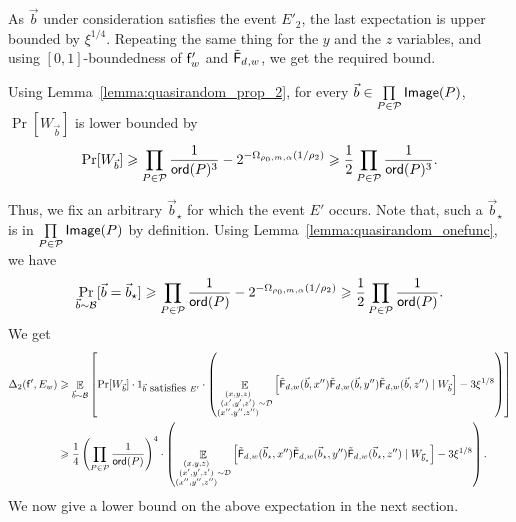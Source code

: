 \documentclass[10pt,a4paper]{amsart}
\newcommand\Expect[2]{{\mathop{\mathbb{E}}_{#1}\left[ {#2} \right]}}
\renewcommand\geq{\geqslant}
\newcommand{\V}[1]{{#1}}
\begin{document}
As $\vec{b}$ under consideration satisfies the event $E'_2$, the last expectation is upper bounded by $\xi^{1/4}$. Repeating the same thing for the $\V y$ and the $\V z$ variables, and using $[0,1]$-boundedness of $\noisyfrefined_{\V w}$ and $\truncfcoarsedecoupled_{,\V w}$, we get the required bound.

Using Lemma~\ref{lemma:quasirandom_prop_2}, for every $\vec{b}\in\prod\limits_{P\in\mathcal{P}}{\sf Image}(P)$, $\Pr[W_{\vec{b}}]$ is lower bounded by
$$\Pr[W_{\vec{b}}] \geq \prod\limits_{P\in\mathcal{P}}\frac{1}{{\sf ord}(P)^3}-2^{-\Omega_{\rho_0, m, \alpha}(1/\rho_2)}\geq \frac{1}{2}\prod\limits_{P\in\mathcal{P}}\frac{1}{{\sf ord}(P)^3}.$$

Thus, we fix an arbitrary $\vec{b}_\star$ for which the event $E'$ occurs. Note that, such a $\vec{b}_\star$ is in $\prod\limits_{P\in\mathcal{P}}{\sf Image}(P)$ by definition. Using Lemma~\ref{lemma:quasirandom_onefunc}, we have
$$\Pr_{\vec{b}\sim \mathcal{B}}[\vec{b} = \vec{b}_\star] \geq \prod\limits_{P\in\mathcal{P}}\frac{1}{{\sf ord}(P)}-2^{-\Omega_{\rho_0, m, \alpha}(1/\rho_2)}\geq \frac{1}{2}\prod\limits_{P\in\mathcal{P}}\frac{1}{{\sf ord}(P)}.$$
We get
\begingroup
\allowdisplaybreaks
\begin{align*}
\Delta_2(\noisyfrefined, E_{\V w}) &\geq\Expect{\vec{b}\sim \mathcal{B}}{\Pr[W_{\vec{b}}] \cdot 1_{\vec{b} ~\mbox{satisfies}~E'}\cdot\left( \Expect{\substack{(\V x, \V y, \V z)\\(\V x', \V y', \V z')\\ (\V x'', \V y'', \V z'')}\sim \mathcal{D}}{\truncfcoarsedecoupled_{,\V w}(\vec{b}, \V x'') \truncfcoarsedecoupled_{,\V w}(\vec{b}, \V y'') \truncfcoarsedecoupled_{,\V w}(\vec{b}, \V z'')  \mid W_{\vec{b}}} - 3\xi^{1/8}\right) }\\
& \geq \frac{1}{4}\left(\prod\limits_{P\in\mathcal{P}}\frac{1}{{\sf ord}(P)}\right)^4 \cdot \left(\Expect{\substack{(\V x, \V y, \V z)\\(\V x', \V y', \V z')\\ (\V x'', \V y'', \V z'')}\sim \mathcal{D}}{\truncfcoarsedecoupled_{,\V w}(\vec{b}_\star, \V x'') \truncfcoarsedecoupled_{,\V w}(\vec{b}_\star, \V y'') \truncfcoarsedecoupled_{,\V w}(\vec{b}_\star, \V z'')  \mid W_{\vec{b}_\star}} - 3\xi^{1/8}\right).
\end{align*}
\endgroup
We now give a lower bound on the above expectation in the next section.
\end{document}
